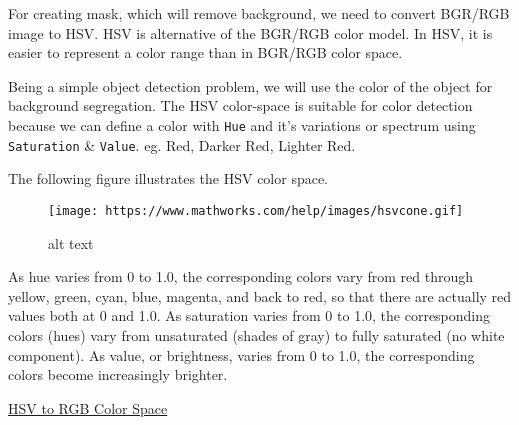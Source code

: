 \documentclass[11pt]{article}
\makeatletter
\def\maxwidth{\ifdim\Gin@nat@width>\linewidth\linewidth
    \else\Gin@nat@width\fi}
\let\Oldincludegraphics\includegraphics
\renewcommand{\includegraphics}[1]{\Oldincludegraphics[width=.8\maxwidth]{#1}}
\makeatother
\begin{document}
For creating mask, which will remove background, we need to convert
BGR/RGB image to HSV. HSV is alternative of the BGR/RGB color model. In
HSV, it is easier to represent a color range than in BGR/RGB color
space.

Being a simple object detection problem, we will use the color of the
object for background segregation. The HSV color-space is suitable for
color detection because we can define a color with \texttt{Hue} and it's
variations or spectrum using \texttt{Saturation} \& \texttt{Value}. eg.
Red, Darker Red, Lighter Red.

The following figure illustrates the HSV color space.

\begin{figure}
\centering
\texttt{[image: https://www.mathworks.com/help/images/hsvcone.gif]}
\caption{alt text}
\end{figure}

As hue varies from 0 to 1.0, the corresponding colors vary from red
through yellow, green, cyan, blue, magenta, and back to red, so that
there are actually red values both at 0 and 1.0. As saturation varies
from 0 to 1.0, the corresponding colors (hues) vary from unsaturated
(shades of gray) to fully saturated (no white component). As value, or
brightness, varies from 0 to 1.0, the corresponding colors become
increasingly brighter.

\href{https://www.mathworks.com/help/images/convert-from-hsv-to-rgb-color-space.html}{HSV
to RGB Color Space}
\end{document}
